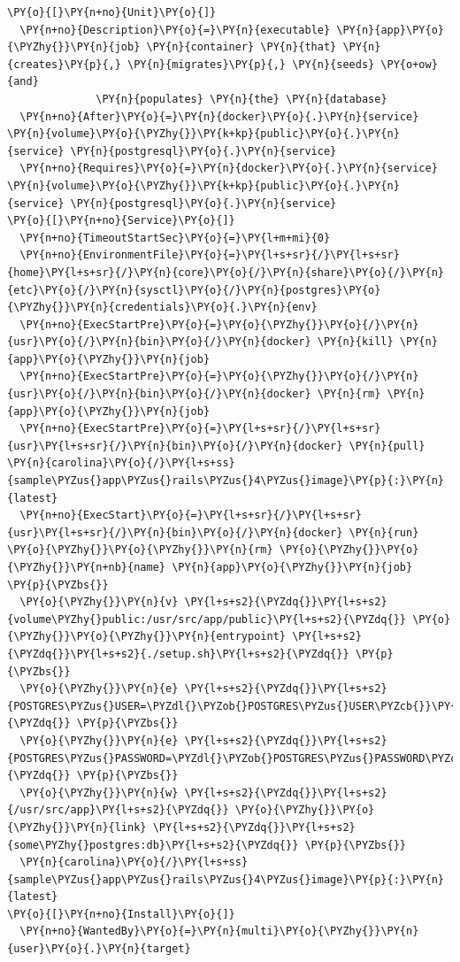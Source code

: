 \begin{codelisting}
\label{code:app-job.service}
\begin{Verbatim}[fontsize=\relsize{-2.5},fontseries=b,commandchars=\\\{\}]
\PY{o}{[}\PY{n+no}{Unit}\PY{o}{]} 
  \PY{n+no}{Description}\PY{o}{=}\PY{n}{executable} \PY{n}{app}\PY{o}{\PYZhy{}}\PY{n}{job} \PY{n}{container} \PY{n}{that} \PY{n}{creates}\PY{p}{,} \PY{n}{migrates}\PY{p}{,} \PY{n}{seeds} \PY{o+ow}{and} 
              \PY{n}{populates} \PY{n}{the} \PY{n}{database}
  \PY{n+no}{After}\PY{o}{=}\PY{n}{docker}\PY{o}{.}\PY{n}{service} \PY{n}{volume}\PY{o}{\PYZhy{}}\PY{k+kp}{public}\PY{o}{.}\PY{n}{service} \PY{n}{postgresql}\PY{o}{.}\PY{n}{service}
  \PY{n+no}{Requires}\PY{o}{=}\PY{n}{docker}\PY{o}{.}\PY{n}{service} \PY{n}{volume}\PY{o}{\PYZhy{}}\PY{k+kp}{public}\PY{o}{.}\PY{n}{service} \PY{n}{postgresql}\PY{o}{.}\PY{n}{service}
\PY{o}{[}\PY{n+no}{Service}\PY{o}{]} 
  \PY{n+no}{TimeoutStartSec}\PY{o}{=}\PY{l+m+mi}{0} 
  \PY{n+no}{EnvironmentFile}\PY{o}{=}\PY{l+s+sr}{/}\PY{l+s+sr}{home}\PY{l+s+sr}{/}\PY{n}{core}\PY{o}{/}\PY{n}{share}\PY{o}{/}\PY{n}{etc}\PY{o}{/}\PY{n}{sysctl}\PY{o}{/}\PY{n}{postgres}\PY{o}{\PYZhy{}}\PY{n}{credentials}\PY{o}{.}\PY{n}{env}
  \PY{n+no}{ExecStartPre}\PY{o}{=}\PY{o}{\PYZhy{}}\PY{o}{/}\PY{n}{usr}\PY{o}{/}\PY{n}{bin}\PY{o}{/}\PY{n}{docker} \PY{n}{kill} \PY{n}{app}\PY{o}{\PYZhy{}}\PY{n}{job} 
  \PY{n+no}{ExecStartPre}\PY{o}{=}\PY{o}{\PYZhy{}}\PY{o}{/}\PY{n}{usr}\PY{o}{/}\PY{n}{bin}\PY{o}{/}\PY{n}{docker} \PY{n}{rm} \PY{n}{app}\PY{o}{\PYZhy{}}\PY{n}{job} 
  \PY{n+no}{ExecStartPre}\PY{o}{=}\PY{l+s+sr}{/}\PY{l+s+sr}{usr}\PY{l+s+sr}{/}\PY{n}{bin}\PY{o}{/}\PY{n}{docker} \PY{n}{pull} \PY{n}{carolina}\PY{o}{/}\PY{l+s+ss}{sample\PYZus{}app\PYZus{}rails\PYZus{}4\PYZus{}image}\PY{p}{:}\PY{n}{latest} 
  \PY{n+no}{ExecStart}\PY{o}{=}\PY{l+s+sr}{/}\PY{l+s+sr}{usr}\PY{l+s+sr}{/}\PY{n}{bin}\PY{o}{/}\PY{n}{docker} \PY{n}{run} \PY{o}{\PYZhy{}}\PY{o}{\PYZhy{}}\PY{n}{rm} \PY{o}{\PYZhy{}}\PY{o}{\PYZhy{}}\PY{n+nb}{name} \PY{n}{app}\PY{o}{\PYZhy{}}\PY{n}{job} \PY{p}{\PYZbs{}}
  \PY{o}{\PYZhy{}}\PY{n}{v} \PY{l+s+s2}{\PYZdq{}}\PY{l+s+s2}{volume\PYZhy{}public:/usr/src/app/public}\PY{l+s+s2}{\PYZdq{}} \PY{o}{\PYZhy{}}\PY{o}{\PYZhy{}}\PY{n}{entrypoint} \PY{l+s+s2}{\PYZdq{}}\PY{l+s+s2}{./setup.sh}\PY{l+s+s2}{\PYZdq{}} \PY{p}{\PYZbs{}}
  \PY{o}{\PYZhy{}}\PY{n}{e} \PY{l+s+s2}{\PYZdq{}}\PY{l+s+s2}{POSTGRES\PYZus{}USER=\PYZdl{}\PYZob{}POSTGRES\PYZus{}USER\PYZcb{}}\PY{l+s+s2}{\PYZdq{}} \PY{p}{\PYZbs{}}
  \PY{o}{\PYZhy{}}\PY{n}{e} \PY{l+s+s2}{\PYZdq{}}\PY{l+s+s2}{POSTGRES\PYZus{}PASSWORD=\PYZdl{}\PYZob{}POSTGRES\PYZus{}PASSWORD\PYZcb{}}\PY{l+s+s2}{\PYZdq{}} \PY{p}{\PYZbs{}}
  \PY{o}{\PYZhy{}}\PY{n}{w} \PY{l+s+s2}{\PYZdq{}}\PY{l+s+s2}{/usr/src/app}\PY{l+s+s2}{\PYZdq{}} \PY{o}{\PYZhy{}}\PY{o}{\PYZhy{}}\PY{n}{link} \PY{l+s+s2}{\PYZdq{}}\PY{l+s+s2}{some\PYZhy{}postgres:db}\PY{l+s+s2}{\PYZdq{}} \PY{p}{\PYZbs{}}
  \PY{n}{carolina}\PY{o}{/}\PY{l+s+ss}{sample\PYZus{}app\PYZus{}rails\PYZus{}4\PYZus{}image}\PY{p}{:}\PY{n}{latest}
\PY{o}{[}\PY{n+no}{Install}\PY{o}{]} 
  \PY{n+no}{WantedBy}\PY{o}{=}\PY{n}{multi}\PY{o}{\PYZhy{}}\PY{n}{user}\PY{o}{.}\PY{n}{target}
\end{Verbatim}
\end{codelisting}

